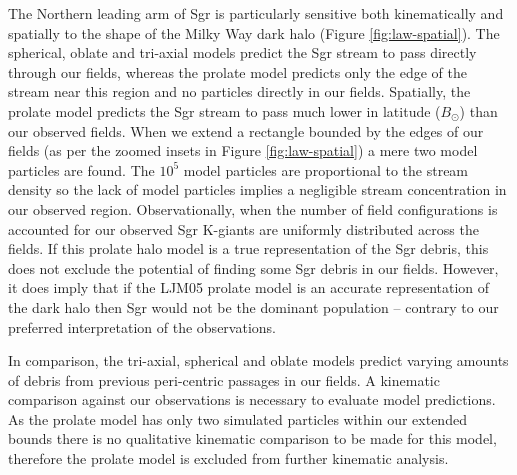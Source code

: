 	The Northern leading arm of Sgr is particularly sensitive both kinematically and spatially to the shape of the Milky Way dark halo (Figure \ref{fig:law-spatial}). The spherical, oblate and tri-axial models predict the Sgr stream to pass directly through our fields, whereas the prolate model predicts only the edge of the stream near this region and no particles directly in our fields. Spatially, the prolate model predicts the Sgr stream to pass much lower in latitude ($B_\odot$) than our observed fields. When we extend a rectangle bounded by the edges of our fields (as per the zoomed insets in Figure \ref{fig:law-spatial}) a mere two model particles are found. The $10^5$ model particles are proportional to the stream density so the lack of model particles implies a negligible stream concentration in our observed region. Observationally, when the number of field configurations is accounted for our observed Sgr K-giants are uniformly distributed across the fields. If this prolate halo model is a true representation of the Sgr debris, this does not exclude the potential of finding some Sgr debris in our fields. However, it does imply that if the LJM05 prolate model is an accurate representation of the dark halo then Sgr would not be the dominant population \--- contrary to our preferred interpretation of the observations.
	
	In comparison, the tri-axial, spherical and oblate models predict varying amounts of debris from previous peri-centric passages in our fields. A kinematic comparison against our observations is necessary to evaluate model predictions. As the prolate model has only two simulated particles within our extended bounds there is no qualitative kinematic comparison to be made for this model, therefore the prolate model is excluded from further kinematic analysis.

